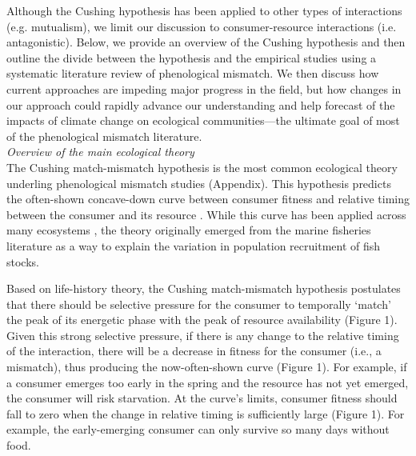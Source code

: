 \documentclass[11pt,letterpaper]{article}
\begin{document}
Although the Cushing hypothesis has been applied to other types of interactions (e.g. mutualism), we limit our discussion to consumer-resource interactions (i.e. antagonistic). Below, we provide an overview of the Cushing hypothesis and then outline the divide between the hypothesis and the empirical studies using a systematic literature review of phenological mismatch. We then discuss how current approaches are impeding major progress in the field, but how changes in our approach could rapidly advance our understanding and help forecast of the impacts of climate change on ecological communities—the ultimate goal of most of the phenological mismatch literature.  \\

\noindent \emph{Overview of the main ecological theory}\\

The Cushing match-mismatch hypothesis is the most common ecological theory underling phenological mismatch studies (Appendix). This hypothesis predicts the often-shown concave-down curve between consumer fitness and relative timing between the consumer and its resource \citep[;Figure 1]{cushing1974}. While this curve has been applied across many ecosystems \citep[e.g.,][]{winder2004, vatka2011, arula2014}, the theory originally emerged from the marine fisheries literature as a way to explain the variation in population recruitment of fish stocks.  \par

Based on life-history theory, the Cushing match-mismatch hypothesis postulates that there should be selective pressure for the consumer to temporally ‘match’ the peak of its energetic phase with the peak of resource availability (Figure 1). Given this strong selective pressure, if there is any change to the relative timing of the interaction, there will be a decrease in fitness for the consumer (i.e., a mismatch), thus producing the now-often-shown curve (Figure 1). For example, if a consumer emerges too early in the spring and the resource has not yet emerged, the consumer will risk starvation. At the curve’s limits, consumer fitness should fall to zero when the change in relative timing is sufficiently large (Figure 1). For example, the early-emerging consumer can only survive so many days without food. \par
\end{document}
